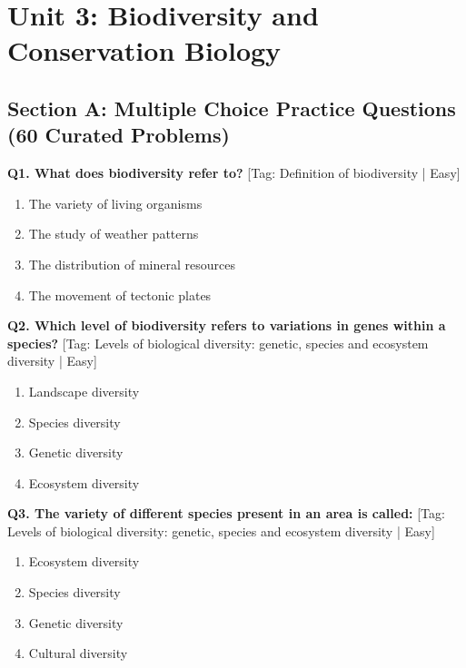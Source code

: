 \chapter{Unit 3: Biodiversity and Conservation Biology}

\section{Section A: Multiple Choice Practice Questions (60 Curated Problems)}

\noindent\textbf{Q1. What does biodiversity refer to?} \hfill [Tag: Definition of biodiversity | Easy]
\begin{enumerate}[label=(\alph*),topsep=2pt,itemsep=1pt,partopsep=0pt,parsep=0pt]
    \item {The variety of living organisms}
    \item {The study of weather patterns}
    \item {The distribution of mineral resources}
    \item {The movement of tectonic plates}
\end{enumerate}
\vspace{2mm}

\noindent\textbf{Q2. Which level of biodiversity refers to variations in genes within a species?} \hfill [Tag: Levels of biological diversity: genetic, species and ecosystem diversity | Easy]
\begin{enumerate}[label=(\alph*),topsep=2pt,itemsep=1pt,partopsep=0pt,parsep=0pt]
    \item {Landscape diversity}
    \item {Species diversity}
    \item {Genetic diversity}
    \item {Ecosystem diversity}
\end{enumerate}
\vspace{2mm}

\noindent\textbf{Q3. The variety of different species present in an area is called:} \hfill [Tag: Levels of biological diversity: genetic, species and ecosystem diversity | Easy]
\begin{enumerate}[label=(\alph*),topsep=2pt,itemsep=1pt,partopsep=0pt,parsep=0pt]
    \item {Ecosystem diversity}
    \item {Species diversity}
    \item {Genetic diversity}
    \item {Cultural diversity}
\end{enumerate}
\vspace{2mm}

